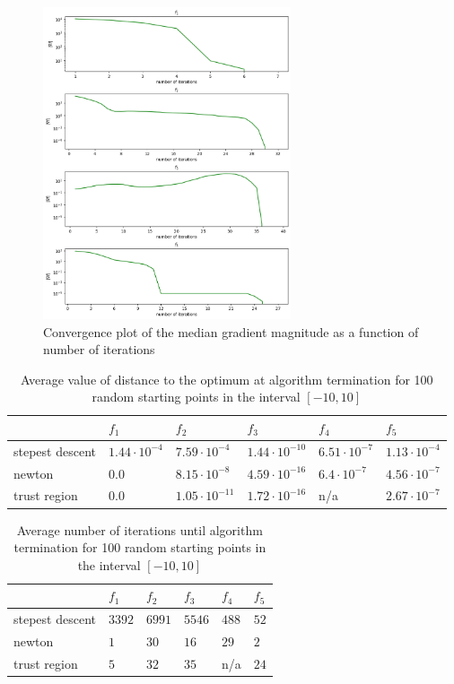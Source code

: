 \documentclass[a4paper]{article}
\begin{document}
\begin{figure}[H]
    \centering
    \includegraphics[width=0.65\textwidth]{plt_grad_norms1000.png}
    \caption{Convergence plot of the median gradient magnitude as a function of number of
      iterations}
  \label{plt2}
\end{figure}


\begin{table}[H]
\centering
\begin{tabular}{|l|l|l|l|l|l|}
\hline
                 & $f_1$         & $f_2$         & $f_3$       & $f_4$       & $f_5$       \\ \hline
stepest descent & $1.44\cdot10^{-4}$ & $7.59\cdot10^{-4}$ & $1.44\cdot10^{-10}$ & $6.51\cdot10^{-7}$ & $1.13\cdot 10^{-4}$ \\ \hline
newton           & $0.0$      & $8.15\cdot10^{-8}$ & $4.59\cdot10^{-16}$ & $6.4\cdot10^{-7}$  & $4.56\cdot10^{-7}$ \\ \hline
trust region    & $0.0$  & $1.05\cdot10^{-11}$ &  $1.72\cdot10^{-16}$ & n/a & $2.67 \cdot 10^{-7}$ \\ \hline
\end{tabular}
\caption{Average value of distance to the optimum at algorithm termination for 100 random starting points in the interval $[-10,10]$}
\label{table1}
\end{table}


\begin{table}[H]
\centering
\begin{tabular}{|l|l|l|l|l|l|}
\hline
                 & $f_1$  & $f_2$  & $f_3$   & $f_4$ & $f_5$  \\ \hline
stepest descent  & $3392$ & $6991$ & $5546$ & $488$ & $52$  \\ \hline
newton           & $1$    & $30$   & $16$   & $29$  & $2 $  \\ \hline
trust region     & $5$    & $32$   & $35$   & n/a   & $24 $ \\ \hline
\end{tabular}
\caption{Average number of iterations until algorithm termination for 100 random starting points in the interval $[-10,10]$}
\label{table2}
\end{table}
\end{document}
